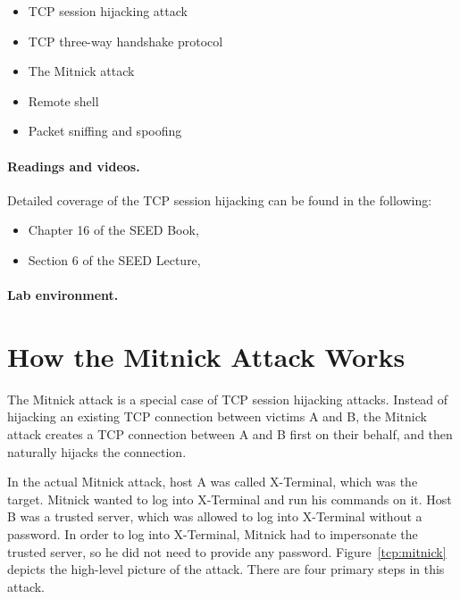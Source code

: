 \begin{itemize}[noitemsep]
\item TCP session hijacking attack
\item TCP three-way handshake protocol
\item The Mitnick attack
\item Remote shell \rsh
\item Packet sniffing and spoofing
\end{itemize}


\paragraph{Readings and videos.}
Detailed coverage of the TCP session hijacking can be found in the following:

\begin{itemize}
\item Chapter 16 of the SEED Book, \seedbook
\item Section 6 of the SEED Lecture, \seedisvideo
\end{itemize}

\paragraph{Lab environment.} \seedenvironment



\section{How the Mitnick Attack Works}

The Mitnick attack is a special case of TCP session hijacking attacks. 
Instead of hijacking an existing TCP connection between victims A and B, 
the Mitnick attack creates a TCP connection between A and B first on 
their behalf, and then naturally hijacks the connection.  


In the actual Mitnick attack, host A was called X-Terminal, 
which was the target. Mitnick
wanted to log into X-Terminal and run his commands on it. 
Host B was a trusted server, which was allowed to log into X-Terminal without a password.  
In order to log into X-Terminal, Mitnick had to impersonate the trusted server, so
he did not need to provide any password. Figure~\ref{tcp:mitnick} depicts
the high-level picture of the attack. 
There are four primary steps in this attack.


